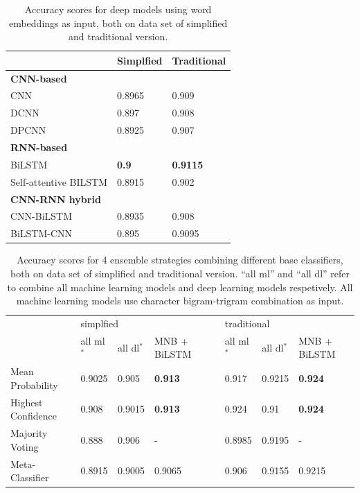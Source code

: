 \documentclass[11pt,a4paper]{article}
\begin{document}
\begin{table}[]
\begin{center}
\begin{tabular}{lll}
\hline
                      & Simplfied & Traditional \\ \hline
\multicolumn{3}{l}{\textbf{CNN-based}}          \\
CNN                   & 0.8965    & 0.909       \\
DCNN                  & 0.897     & 0.908       \\
DPCNN                 & 0.8925    & 0.907       \\ \hline
\multicolumn{3}{l}{\textbf{RNN-based}}          \\
BiLSTM                & \textbf{0.9}       & \textbf{0.9115}      \\
Self-attentive BILSTM & 0.8915    & 0.902       \\ \hline
\multicolumn{3}{l}{\textbf{CNN-RNN hybrid}}     \\
CNN-BiLSTM            & 0.8935    & 0.908       \\
BiLSTM-CNN            & 0.895     & 0.9095      \\ \hline
\end{tabular}
\caption{Accuracy scores for deep models using word embeddings as input, both on data set of simplified and traditional version.}
\label{dl_model_p}
\end{center}
\end{table}

\begin{table}[]
\begin{tabular}{llllllll}
\hline
                   & \multicolumn{3}{l}{simplfied}    &  & \multicolumn{3}{l}{traditional}  \\ \cline{2-4} \cline{6-8} 
                   & all ml$^*$ & all dl$^*$ & MNB + BiLSTM   &  & all ml$^*$ & all dl$^*$ & MNB + BiLSTM   \\ \hline
Mean Probability   & 0.9025 & 0.905  & \textbf{0.913} &  & 0.917  & 0.9215 & \textbf{0.924} \\
Highest Confidence & 0.908  & 0.9015 & \textbf{0.913} &  & 0.924  & 0.91   & \textbf{0.924} \\
Majority Voting    & 0.888  & 0.906  & -              &  & 0.8985 & 0.9195 & -              \\
Meta-Classifier    & 0.8915 & 0.9005 & 0.9065         &  & 0.906  & 0.9155 & 0.9215         \\ \hline
\end{tabular}
\caption{Accuracy scores for 4 ensemble strategies combining different base classifiers, both on data set of simplified and traditional version. ``all ml'' and ``all dl'' refer to combine all machine learning models and deep learning models respetively. All machine learning models use character bigram-trigram combination as input.}
\label{ensemble_model_p}
\end{table}
\end{document}
